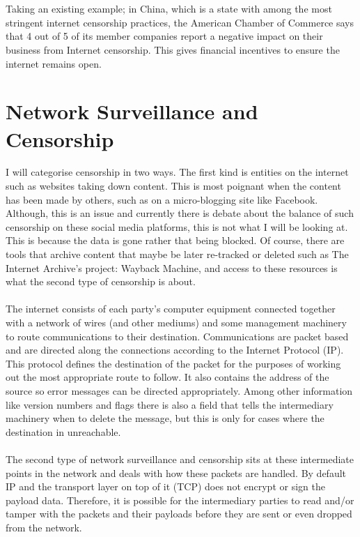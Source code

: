 \documentclass[12pt,a4paper]{article}
\begin{document}
\\\\
Taking an existing example; in China, which is a state with among the most stringent internet censorship practices, the American Chamber of Commerce\cite{amcham} says that 4 out of 5 of its member companies report a negative impact on their business from Internet censorship. This gives financial incentives to ensure the internet remains open.

\section{Network Surveillance and Censorship}

I will categorise censorship in two ways. The first kind is entities on the internet such as websites taking down content. This is most poignant when the content has been made by others, such as on a micro-blogging site like Facebook. Although, this is an issue and currently there is debate about the balance of such censorship on these social media platforms, this is not what I will be looking at. This is because the data is gone rather that being blocked. Of course, there are tools that archive content that maybe be later re-tracked or deleted such as The Internet Archive's project: Wayback Machine\cite{wb}, and access to these resources is what the second type of censorship is about.
\\\\
The internet consists of each party's computer equipment connected together with a network of wires (and other mediums) and some management machinery to route communications to their destination.  Communications are packet based and are directed along the connections according to the Internet Protocol (IP)\cite{ip4}. This protocol defines the destination of the packet for the purposes of working out the most appropriate route to follow. It also contains the address of the source so error messages can be directed appropriately. Among other information like version numbers and flags there is also a field that tells the intermediary machinery when to delete the message, but this is only for cases where the destination in unreachable. 
\\\\
The second type of network surveillance and censorship sits at these intermediate points in the network and deals with how these packets are handled. By default IP and the transport layer on top of it (TCP) does not encrypt or sign the payload data. Therefore, it is possible for the intermediary parties to read and/or tamper with the packets and their payloads before they are sent or even dropped from the network. 
\end{document}

